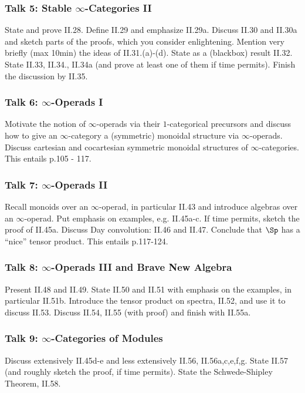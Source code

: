 \documentclass{article}
\begin{document}
\subsubsection*{Talk 5: Stable $\infty$-Categories II}
State and prove II.28. Define II.29 and emphasize II.29a.
Discuss II.30 and II.30a and sketch parts of the proofs, which you consider
enlightening. Mention very briefly (max 10min) the ideas of II.31.(a)-(d).
State as a (blackbox) result II.32. State II.33, II.34., II.34a 
(and prove at least one of them if time permits).
Finish the discussion by II.35.

\subsubsection*{Talk 6: $\infty$-Operads I}
Motivate the notion of $\infty$-operads via their $1$-categorical 
precursors and discuss how to give an $\infty$-category a 
(symmetric) monoidal structure via $\infty$-operads. Discuss 
cartesian and cocartesian symmetric monoidal structures of
$\infty$-categories. This entails p.105 - 117.

\subsubsection*{Talk 7: $\infty$-Operads II}
Recall monoids over an $\infty$-operad, in particular II.43 and 
introduce algebras over an $\infty$-operad.
Put emphasis on examples, e.g. II.45a-c.
If time permits, sketch the proof of II.45a.
Discuss Day convolution: II.46 and II.47.
Conclude that $\Sp$ has a \enquote{nice} tensor product.
This entails p.117-124.

\subsubsection*{Talk 8: $\infty$-Operads III and Brave New Algebra}
Present II.48 and II.49. State II.50 and II.51 with emphasis on 
the examples, in particular II.51b. Introduce the tensor product on
spectra, II.52, and use it to discuss II.53. Discuss II.54, II.55 (with proof)
and finish with II.55a.

\subsubsection*{Talk 9: $\infty$-Categories of Modules}
Discuss extensively II.45d-e and less extensively II.56, II.56a,c,e,f,g.
State II.57 (and roughly sketch the proof, if time permits).
State the Schwede-Shipley Theorem, II.58.
\end{document}
